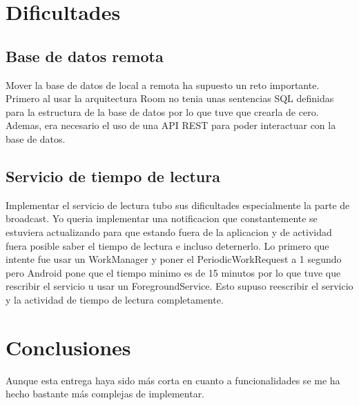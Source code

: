\documentclass[a4paper,11pt]{report}
\begin{document}
  \chapter{Dificultades}
    \section{Base de datos remota}
      Mover la base de datos de local a remota ha supuesto un reto importante.
      Primero al usar la arquitectura Room no tenia unas sentencias SQL definidas para la estructura de la base de datos por lo que tuve que crearla de cero.
      Ademas, era necesario el uso de una API REST para poder interactuar con la base de datos.
    \section{Servicio de tiempo de lectura}
      Implementar el servicio de lectura tubo sus dificultades especialmente la parte de broadcast.
      Yo queria implementar una notificacion que constantemente se estuviera actualizando para que estando fuera de la aplicacion y de actividad fuera posible saber el tiempo de lectura e incluso deternerlo.
      Lo primero que intente fue usar un WorkManager y poner el PeriodicWorkRequest a 1 segundo pero Android pone que el tiempo minimo es de 15 minutos por lo que tuve que rescribir el servicio u usar un ForegroundService.
      Esto supuso reescribir el servicio y la actividad de tiempo de lectura completamente.
  \chapter{Conclusiones}
    Aunque esta entrega haya sido más corta en cuanto a funcionalidades se me ha hecho bastante más complejas de implementar.
  \printbibliography[title=Bibliografía]
\end{document}
